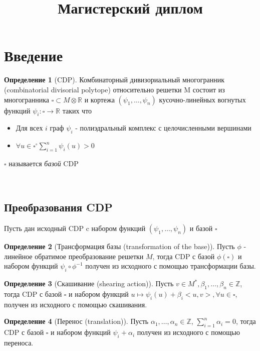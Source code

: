 \documentclass[16pt]{article}
\title{Магистерский диплом}
\theoremstyle{definition}
\newtheorem{definition}{Определение}[section]
\begin{document}
\maketitle

\section{Введение}

\begin{definition}[CDP] 
Комбинаторный дивизориальный многогранник (combinatorial divisorial polytope) относительно решетки M состоит из многогранника $\square \subset M \otimes \mathds{R}$ и кортежа $(\psi_1, \dots, \psi_n)$ кусочно-линейных вогнутых функций $\psi_i: \square \rightarrow \mathds{R}$ таких что
\begin{itemize}
	\item[1] Для всех $i$ граф $\psi_i$ - полиэдральный комплекс с целочисленными вершинами
	\item[2] $\forall u \in \square^{\circ} \sum_{i=1}^n\psi_i(u) > 0$
\end{itemize}
$\square$ называется \emph{базой} CDP
\end{definition}

\\

\subsection{Преобразования CDP}
Пусть дан исходный CDP c набором функций $(\psi_1, \dots, \psi_n)$ и базой $\square$

\begin{definition}[Трансформация базы (transformation of the base)]
Пусть $\phi$ - линейное обратимое преобразование решетки $M$, тогда CDP с базой $\phi(\square)$ и набором функций 
$\psi_i \circ \phi^{-1}$ получен из исходного с помощью  трансформации базы.
\end{definition}

\begin{definition}[Скашивание (shearing action)]
Пусть $v \in M^*, \beta_1, \dots, \beta_n \in \mathds{Z}$, тогда CDP с базой $\square$ и набором функций $u \mapsto
 \psi_i(u) + \beta_i<u, v>, \forall u \in \square$, получен из исходного с помощью скашивания.
\end{definition}

\begin{definition}[Перенос (translation)]
Пусть $\alpha_1, \dots, \alpha_n \in \mathds{Z}
$, $\sum_{i=1}^n \alpha_i = 0$, тогда CDP с базой $\square$ и набором функций $\psi_i + \alpha_i$ получен из исходного с помощью переноса.
\end{definition}
\end{document}
